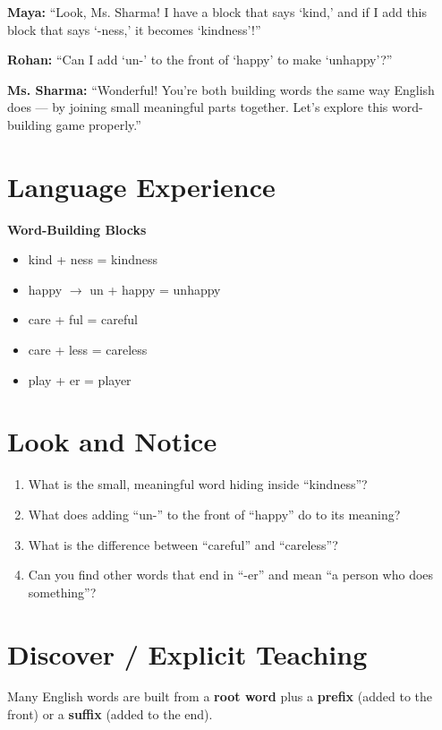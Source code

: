 \textbf{Maya:} ``Look, Ms. Sharma! I have a block that says `kind,' and if I add this block that says `-ness,' it becomes `kindness'!''

\textbf{Rohan:} ``Can I add `un-' to the front of `happy' to make `unhappy'?''

\textbf{Ms. Sharma:} ``Wonderful! You're both building words the same way English does --- by joining small meaningful parts together. Let's explore this word-building game properly.''

\section{Language Experience}
\textbf{Word-Building Blocks}

\begin{itemize}
    \item kind + ness = kindness
    \item happy $\rightarrow$ un + happy = unhappy
    \item care + ful = careful
    \item care + less = careless
    \item play + er = player
\end{itemize}

\section{Look and Notice}
\begin{thinkbox}
\begin{enumerate}
    \item What is the small, meaningful word hiding inside ``kindness''?
    \item What does adding ``un-'' to the front of ``happy'' do to its meaning?
    \item What is the difference between ``careful'' and ``careless''?
    \item Can you find other words that end in ``-er'' and mean ``a person who does something''?
\end{enumerate}
\end{thinkbox}

\section{Discover / Explicit Teaching}
Many English words are built from a \textbf{root word} plus a \textbf{prefix} (added to the front) or a \textbf{suffix} (added to the end).

